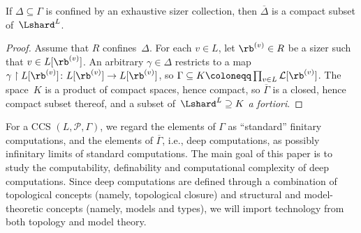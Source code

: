 \begin{proposition}\label{prop:confined-compact}
    If $\Delta\subseteq\Gamma$ is confined by an exhaustive sizer collection, then $\overline{\Delta}$ is a compact subset of~$\Lshard^L$.
\end{proposition}

\begin{proof}
    Assume that $R$ confines~$\Delta$.
    For each $v\in L$, let $\rb^{(v)}\in R$ be a sizer such that $v\in L[\rb^{(v)}]$.
    An arbitrary $\gamma\in\Delta$ restricts to a map $\gamma\restriction L[\rb^{(v)}]\colon L[\rb^{(v)}]\to L[\rb^{(v)}]$, so $\Gamma \subseteq K \coloneqq \prod_{v\in L}\mathcal{L}[\rb^{(v)}]$.
    The space~$K$ is a product of compact spaces, hence compact, so $\overline{\Gamma}$ is a closed, hence compact subset thereof, and a subset of~$\Lshard^L\supseteq K$ \emph{a fortiori}.
\end{proof}

For a CCS $(L,\mathcal{P},\Gamma)$, we regard the elements of $\Gamma$ as ``standard'' finitary computations, and the elements of $\overline{\Gamma}$, i.e., deep computations, as possibly infinitary limits of standard computations.
The main goal of this paper is to study the computability, definability and computational complexity of deep computations.
Since deep computations are defined through a combination of topological concepts (namely, topological closure) and structural and model-theoretic concepts (namely, models and types), we will import technology from both topology and model theory.


